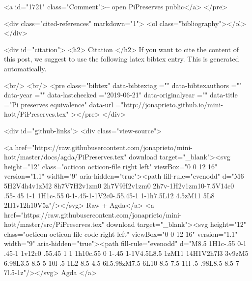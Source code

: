 <a id="1721" class="Comment">-- open PiPreserves public</a>
</pre>


  <div class="cited-references" markdown="1">
  <ol class="bibliography"></ol>
  </div>


  
  <div id="citation">
  <h2> Citation </h2>
  If you want to cite the content of this post,
  we suggest to use the following latex bibtex entry.
  This is generated automatically.

  <br/>
  <br/>
  <pre class="bibtex"
       data-bibtextag =""
       data-bibtexauthors =""
       data-year =""
       data-lastchecked ="2019-06-21"
       data-originalyear =""
       data-title ="Pi preserves equivalence"
       data-url ="http://jonaprieto.github.io/mini-hott/PiPreserves.tex"
  ></pre>
  </div>
  

  <div id="github-links">
    <div class="view-source">
      
        <a href="https://raw.githubusercontent.com/jonaprieto/mini-hott/master/docs/agda/PiPreserves.tex" download target="_blank"><svg height="12" class="octicon octicon-file right left" viewBox="0 0 12 16" version="1.1" width="9" aria-hidden="true"><path fill-rule="evenodd" d="M6 5H2V4h4v1zM2 8h7V7H2v1zm0 2h7V9H2v1zm0 2h7v-1H2v1zm10-7.5V14c0 .55-.45 1-1 1H1c-.55 0-1-.45-1-1V2c0-.55.45-1 1-1h7.5L12 4.5zM11 5L8 2H1v12h10V5z"/></svg> Raw + Agda</a>
        <a href="https://raw.githubusercontent.com/jonaprieto/mini-hott/master/src/PiPreserves.tex" download target="_blank"><svg height="12" class="octicon octicon-file-code right left" viewBox="0 0 12 16" version="1.1" width="9" aria-hidden="true"><path fill-rule="evenodd" d="M8.5 1H1c-.55 0-1 .45-1 1v12c0 .55.45 1 1 1h10c.55 0 1-.45 1-1V4.5L8.5 1zM11 14H1V2h7l3 3v9zM5 6.98L3.5 8.5 5 10l-.5 1L2 8.5 4.5 6l.5.98zM7.5 6L10 8.5 7.5 11l-.5-.98L8.5 8.5 7 7l.5-1z"/></svg> Agda </a>
      
